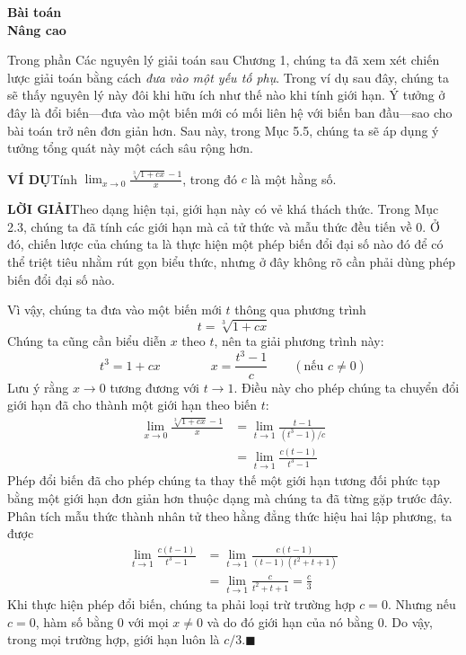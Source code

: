 \noindent
\begin{minipage}[t]{0.24\textwidth}
    \vspace{0pt}%
    {\fontsize{23}{27}\selectfont\bfseries\sffamily\color{stewartpurple}Bài toán\\[2pt] Nâng cao}
\end{minipage}%
\hfill
\begin{minipage}[t]{0.73\textwidth}
    \vspace{0pt}%
    Trong phần Các nguyên lý giải toán sau Chương 1, chúng ta đã xem xét chiến lược giải toán bằng cách \textit{đưa vào một yếu tố phụ}. Trong ví dụ sau đây, chúng ta sẽ thấy nguyên lý này đôi khi hữu ích như thế nào khi tính giới hạn. Ý tưởng ở đây là đổi biến---đưa vào một biến mới có mối liên hệ với biến ban đầu---sao cho bài toán trở nên đơn giản hơn. Sau này, trong Mục 5.5, chúng ta sẽ áp dụng ý tưởng tổng quát này một cách sâu rộng hơn.

    \vspace{5pt}
    \textbf{\textsf{\color{stewartcyan}VÍ DỤ}}\quad Tính $\displaystyle \lim_{x \to 0} \frac{\sqrt[3]{1 + cx} - 1}{x}$, trong đó $c$ là một hằng số.

    \vspace{3pt}
    \textbf{\textsf{\color{stewartcyan}LỜI GIẢI}}\quad Theo dạng hiện tại, giới hạn này có vẻ khá thách thức. Trong Mục 2.3, chúng ta đã tính các giới hạn mà cả tử thức và mẫu thức đều tiến về 0. Ở đó, chiến lược của chúng ta là thực hiện một phép biến đổi đại số nào đó để có thể triệt tiêu nhằm rút gọn biểu thức, nhưng ở đây không rõ cần phải dùng phép biến đổi đại số nào.

    Vì vậy, chúng ta đưa vào một biến mới $t$ thông qua phương trình
    \[
    t = \sqrt[3]{1 + cx}
    \]
    Chúng ta cũng cần biểu diễn $x$ theo $t$, nên ta giải phương trình này:
    \[
    t^3 = 1 + cx \qquad\qquad x = \frac{t^3 - 1}{c} \qquad (\text{nếu } c \neq 0)
    \]
    Lưu ý rằng $x \to 0$ tương đương với $t \to 1$. Điều này cho phép chúng ta chuyển đổi giới hạn đã cho thành một giới hạn theo biến $t$:
    \begin{align*}
    \lim_{x \to 0} \frac{\sqrt[3]{1 + cx} - 1}{x} &= \lim_{t \to 1} \frac{t - 1}{(t^3 - 1)/c} \\[3pt]
    &= \lim_{t \to 1} \frac{c(t - 1)}{t^3 - 1}
    \end{align*}
    Phép đổi biến đã cho phép chúng ta thay thế một giới hạn tương đối phức tạp bằng một giới hạn đơn giản hơn thuộc dạng mà chúng ta đã từng gặp trước đây. Phân tích mẫu thức thành nhân tử theo hằng đẳng thức hiệu hai lập phương, ta được
    \begin{align*}
    \lim_{t \to 1} \frac{c(t - 1)}{t^3 - 1} &= \lim_{t \to 1} \frac{c(t - 1)}{(t - 1)(t^2 + t + 1)} \\[3pt]
    &= \lim_{t \to 1} \frac{c}{t^2 + t + 1} = \frac{c}{3}
    \end{align*}
    Khi thực hiện phép đổi biến, chúng ta phải loại trừ trường hợp $c = 0$. Nhưng nếu $c = 0$, hàm số bằng 0 với mọi $x \neq 0$ và do đó giới hạn của nó bằng 0. Do vậy, trong mọi trường hợp, giới hạn luôn là $c/3$.\hfill{\color{stewartcyan}$\blacksquare$}


\end{minipage}
